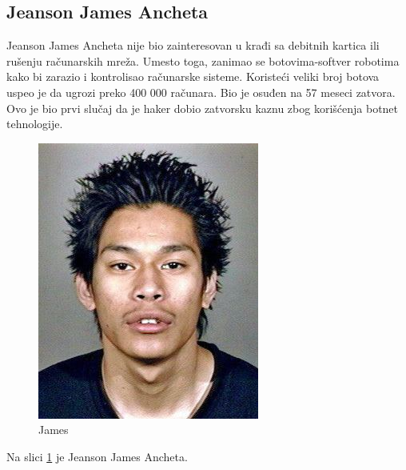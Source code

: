 \documentclass[a4paper]{article}
\begin{document}
\subsection{Jeanson James Ancheta}
Jeanson James Ancheta nije bio zainteresovan u krađi sa debitnih kartica ili rušenju računarskih mreža. Umesto toga, zanimao se botovima-softver robotima kako bi zarazio i kontrolisao računarske sisteme. Koristeći veliki broj botova uspeo je da ugrozi preko 400 000 računara. Bio je osuđen na 57 meseci zatvora. Ovo je bio prvi slučaj da je haker dobio zatvorsku kaznu zbog korišćenja botnet tehnologije.
\begin{figure}[h!]
	\begin{center}
		\includegraphics[scale=0.30]{james.jpg}
	\end{center}
	\caption{James}
	\label{fig:james}
\end{figure}

Na slici \ref{fig:james} je Jeanson James Ancheta.
\newpage
\end{document}
